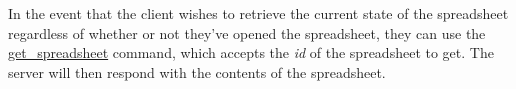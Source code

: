 In the event that the client wishes to retrieve the current state of the 
spreadsheet regardless of whether or not they’ve opened the spreadsheet, 
they can use the \hyperref[sec:message:get_spreadsheet]{get\_spreadsheet} 
command, which accepts the \emph{id} of the spreadsheet to get. The server 
will then respond with the contents of the spreadsheet.
